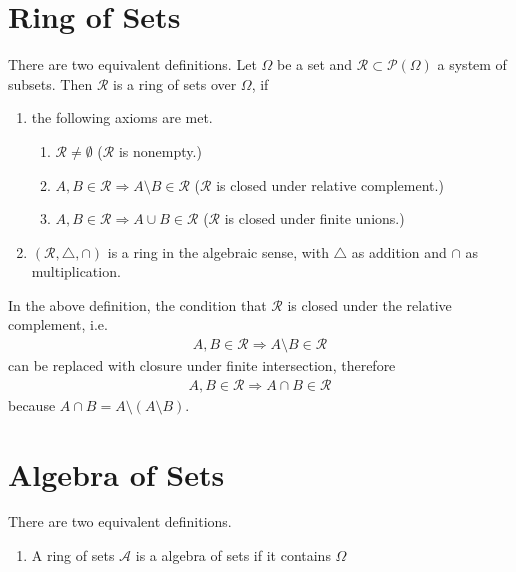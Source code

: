 \section{Ring of Sets}
\begin{definition}
    There are two equivalent definitions. Let {\color{mathif}\(\Omega\)} be a {\color{mathif}set} and {\color{mathif}\(\mathcal{R} \subset \mathcal{P}(\Omega)\)} a {\color{mathif}system of subsets}. Then {\color{maththen} \(\mathcal{R}\)}  is a {\color{maththen}ring of sets over \(\Omega\)}, if
    \begin{enumerate}
        \item the following axioms are met.
        \begin{enumerate}
            \item \(\mathcal{R} \neq \emptyset\) (\(\mathcal{R}\) is {\color{mathrem}nonempty.})
            \item \(A, B \in \mathcal{R} \Rightarrow A \setminus B \in \mathcal{R}\) (\(\mathcal{R}\) is {\color{mathrem}closed under relative complement}.)
            \item \(A, B \in \mathcal{R} \Rightarrow A \cup B \in \mathcal{R}\) (\(\mathcal{R}\) is {\color{mathrem}closed under finite unions}.)
        \end{enumerate}
        \item \((\mathcal{R}, \triangle, \cap)\) is a ring in the algebraic sense, with \(\triangle\) as addition and \(\cap\) as multiplication.
    \end{enumerate}
\end{definition}
\begin{remark}
    In the above definition, the condition that \(\mathcal{R}\) is closed under the relative complement, i.e.
    \begin{align}
        A, B \in \mathcal{R} \Rightarrow A \setminus B \in \mathcal{R}
    \end{align}
    can be replaced with closure under finite intersection, therefore
    \begin{align}
        A, B \in \mathcal{R} \Rightarrow A \cap B \in \mathcal{R}
    \end{align}
    because \(A \cap B = A \setminus (A \setminus B)\).
\end{remark}
\begin{theorem}
\end{theorem}
%
%
%
%
%
\section{Algebra of Sets}
\begin{definition}
    There are two equivalent definitions.
    \begin{enumerate}
        \item A ring of sets \(\mathcal{A}\) is a algebra of sets if it contains \(\Omega\) 
    \end{enumerate}
\end{definition}
%
%
%
%
%
